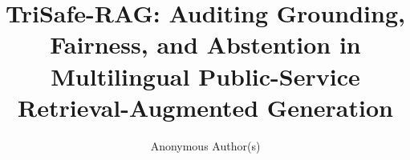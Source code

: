\documentclass[sigconf,anonymous,review]{acmart}
\begin{document}
\title{TriSafe-RAG: Auditing Grounding, Fairness, and Abstention in Multilingual Public-Service Retrieval-Augmented Generation}

\author{Anonymous Author(s)}


\end{document}
